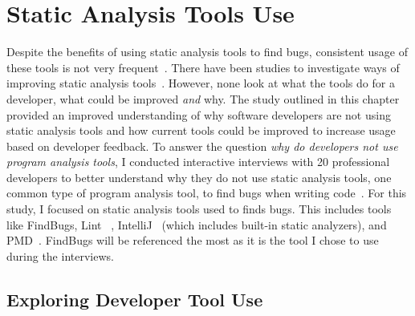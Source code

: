 \chapter{Static Analysis Tools Use}
\label{chap:why}

Despite the benefits of using static analysis tools to find bugs, consistent
usage of these tools is not very frequent~\cite{Ayewah:2008:FindBugs, ge2012reconciling}. 
There have been studies to investigate ways of improving static analysis tools~\cite{Bessey:2010:Coverity, Khoo:2008:PathProjection}.
However, none look at what the tools do for a developer, what could be improved \emph{and}
why. The study outlined in this chapter provided an improved understanding 
of why software developers are not using static analysis tools and how
current tools could be improved to increase usage based on developer feedback.
To answer the question \emph{why do developers not use program analysis tools}, I conducted interactive interviews with 20 professional developers to better understand why they do not use static analysis tools, one common type of program analysis tool, to find bugs when writing code~\cite{johnson2013don}.
For this study, I focused on static analysis tools used to finds bugs.
This includes tools like FindBugs, Lint~\cite{Johnson:1978:Lint} ,
IntelliJ~\cite{IntelliJIDEA} (which includes built-in static analyzers), and
PMD~\cite{PMD}. FindBugs will be referenced the most as it is the tool I chose
to use during the interviews.

\section{Exploring Developer Tool Use}

